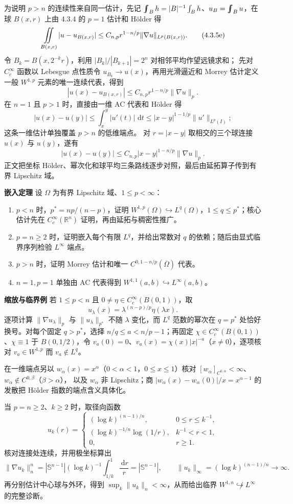 \documentclass[11pt,a4paper]{ctexart}
\newcommand{\R}{\mathbb R}
\newcommand{\dd}{\,\mathrm d}
\newcommand{\fint}{\mathop{\vphantom{\int}\smash{\int}\mkern-13mu\int}}
\newcommand{\planitem}[1]{\par\smallskip\noindent\textcolor{deepblue}{\textbf{#1}}\quad}
\begin{document}
为说明 $p>n$ 的连续性来自同一估计，先记
$\fint_B h=|B|^{-1}\int_Bh$、$u_B=\fint_Bu$，在球 $B(x,r)$ 上由 4.3.4 的 $p=1$
估计和 Hölder 得
\[
 \fint_{B(x,r)}|u-u_{B(x,r)}|
 \le C_{n,p}r^{1-n/p}\|\nabla u\|_{L^p(B(x,r))}. \tag{4.3.5e}
\]
令 $B_k=B(x,2^{-k}r)$，利用 $|B_k|/|B_{k+1}|=2^n$ 对相邻平均作望远镜求和；
先对 $C_c^\infty$ 函数以 Lebesgue 点性质令 $u_{B_k}\to u(x)$，再用光滑逼近和
Morrey 估计定义一般 $W^{1,p}$ 元素的唯一连续代表，得到
\[
 |u(x)-u_{B(x,r)}|\le C_{n,p}r^{1-n/p}\|\nabla u\|_p. \tag{4.3.5f}
\]
在 $n=1$ 且 $p>1$ 时，直接由一维 AC 代表和 Hölder 得
\[
 |u(x)-u(y)|\le\int_x^y|u'(t)|\,\dd t
 \le |x-y|^{1-1/p}\|u'\|_{L^p(I)};
\]
这条一维估计单独覆盖 $p>n$ 的低维端点。
对 $r=|x-y|$ 取相交的三个球连接 $u(x)$ 与 $u(y)$，遂有
\[
 |u(x)-u(y)|\le C_{n,p}|x-y|^{1-n/p}\|\nabla u\|_p. \tag{4.3.5g}
\]
正文把坐标 Hölder、幂次化和球平均三条路线逐步对照，最后由延拓算子传到有界 Lipschitz 域。

\planitem{嵌入定理}
设 $\Omega$ 为有界 Lipschitz 域、$1\le p<\infty$：
\begin{enumerate}
\item $p<n$ 时，$p^*=np/(n-p)$，证明
$W^{1,p}(\Omega)\hookrightarrow L^q(\Omega)$，$1\le q\le p^*$；核心估计先在 $C_c^\infty(\R^n)$ 证明，再由延拓与稠密性推广。
\item $p=n\ge2$ 时，证明嵌入每个有限 $L^q$，并给出常数对 $q$ 的依赖；随后由显式临界序列检验 $L^\infty$ 端点。
\item $p>n$ 时，证明 Morrey 估计和唯一 $C^{0,1-n/p}(\overline\Omega)$ 代表。
\item $n=1,p=1$ 单独由 AC 代表得到 $W^{1,1}(a,b)\hookrightarrow L^\infty(a,b)$。
\end{enumerate}

\planitem{缩放与临界例}
若 $1\le p<n$ 且 $0\ne\eta\in C_c^\infty(B(0,1))$，取
\[
u_\lambda(x)=\lambda^{(n-p)/p}\eta(\lambda x).
\]
逐项计算 $\|\nabla u_\lambda\|_p$ 与 $\|u_\lambda\|_{p^*}$ 不随 $\lambda$ 变化，而 $L^q$ 范数的幂次在 $q=p^*$ 处恰好换号。对每个固定 $q>p^*$，选择
$n/q\le a<n/p-1$；再固定
$\chi\in C_c^\infty(B(0,1))$、$\chi\equiv1$ 于 $B(0,1/2)$，令
$v_a(0)=0$、$v_a(x)=\chi(x)|x|^{-a}$（$x\ne0$），逐项核对 $v_a\in W^{1,p}$ 而
$v_a\notin L^q$。

在一维端点另以 $w_\alpha(x)=x^\alpha$（$0<\alpha<1$，$0\le x\le1$）核对
$[w_\alpha]_{C^{0,\alpha}}<\infty$、$w_\alpha\notin C^{0,\beta}$（$\beta>\alpha$），
以及 $w_\alpha$ 非 Lipschitz；商
$|w_\alpha(x)-w_\alpha(0)|/x=x^{\alpha-1}$ 的发散把 Hölder 指数的端点含义具体化。

当 $p=n\ge2$、$k\ge2$ 时，取径向函数
\[
u_k(r)=
\begin{cases}
(\log k)^{(n-1)/n},&0\le r\le k^{-1},\\
(\log k)^{-1/n}\log(1/r),&k^{-1}<r<1,\\
0,&r\ge1.
\end{cases}
\]
核对连接处连续，并用极坐标算出
\[
\|\nabla u_k\|_n^n
=|\mathbb S^{n-1}|(\log k)^{-1}
\int_{1/k}^1\frac{\dd r}{r}
=|\mathbb S^{n-1}|,
\qquad
\|u_k\|_\infty=(\log k)^{(n-1)/n}\to\infty.
\]
再分别估计中心球与外环，得到 $\sup_k\|u_k\|_n<\infty$，从而给出临界 $W^{1,n}\not\hookrightarrow L^\infty$ 的完整诊断。
\end{document}
